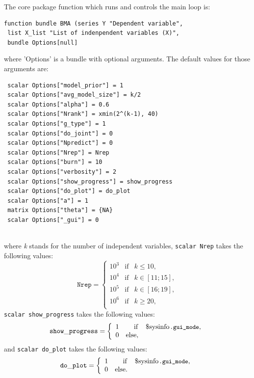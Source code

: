 \noindent The core package function which runs and controls the main loop is:
\begin{lstlisting}
function bundle BMA (series Y "Dependent variable",
 list X_list "List of indenpendent variables (X)",
 bundle Options[null]
\end{lstlisting}
where 'Options' is a bundle with optional arguments. The default
values for those arguments are:
\begin{lstlisting}
 scalar Options["model_prior"] = 1
 scalar Options["avg_model_size"] = k/2
 scalar Options["alpha"] = 0.6
 scalar Options["Nrank"] = xmin(2^(k-1), 40)
 scalar Options["g_type"] = 1
 scalar Options["do_joint"] = 0
 scalar Options["Npredict"] = 0
 scalar Options["Nrep"] = Nrep
 scalar Options["burn"] = 10
 scalar Options["verbosity"] = 2
 scalar Options["show_progress"] = show_progress
 scalar Options["do_plot"] = do_plot
 scalar Options["a"] = 1
 matrix Options["theta"] = {NA}
 scalar Options["_gui"] = 0
 
\end{lstlisting}\label{sec:default_option_bundle}
where \textit{k} stands for the number of independent variables,
\lstinline!scalar Nrep! takes the following values:
\begin{equation}
	\mathtt{Nrep} = \left\{
		\begin{array}{ccl}
			10^3 & \mathrm{if} & k \leq 10,\\
			10^4 & \mathrm{if} & k \in [11;15],\\
			10^5 & \mathrm{if} & k \in [16;19],\\
			10^6 & \mathrm{if} & k \geq 20,\\
		\end{array}
	\right.
	\label{eq:Nrep_setup}
\end{equation}
\lstinline!scalar show_progress! takes the following values:
\begin{equation}
	\mathtt{show\_progress} = \left\{
	\begin{array}{crl}
		1 & \mathrm{if} & \textrm{\lstinline!$sysinfo!\texttt{\small.gui\_mode}},\\
		0 & \mathrm{else}, &\\
	\end{array}
	\right.
	\label{eq:show_progress_setup}
\end{equation}
and \lstinline!scalar do_plot! takes the following values:
\begin{equation}
	\mathtt{do\_plot} = \left\{
	\begin{array}{crl}
		1 & \mathrm{if} & \textrm{\lstinline!$sysinfo!\texttt{\small.gui\_mode}},\\
		0 & \mathrm{else}. &\\
	\end{array}
	\right.
	\label{eq:do_plot_setup}
\end{equation}
